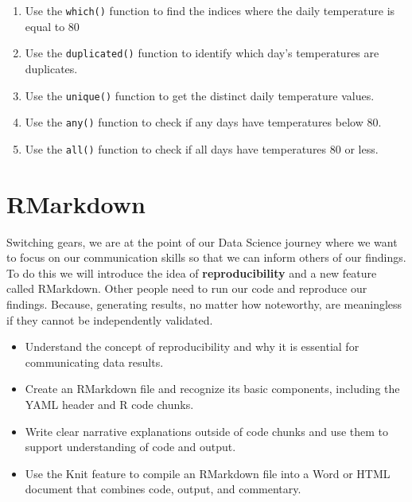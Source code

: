 \documentclass[
  letterpaper,
  DIV=11,
  numbers=noendperiod]{scrreprt}
\providecommand{\tightlist}{%
  \setlength{\itemsep}{0pt}\setlength{\parskip}{0pt}}
\begin{document}
\begin{itemize}
  \begin{enumerate}
  \def\labelenumi{\alph{enumi})}
  \tightlist
  \item
    Use the \texttt{which()} function to find the indices where the
    daily temperature is equal to 80
  \item
    Use the \texttt{duplicated()} function to identify which day's
    temperatures are duplicates.
  \item
    Use the \texttt{unique()} function to get the distinct daily
    temperature values.
  \item
    Use the \texttt{any()} function to check if any days have
    temperatures below 80.
  \item
    Use the \texttt{all()} function to check if all days have
    temperatures 80 or less.
  \end{enumerate}
\end{itemize}


\chapter{RMarkdown}\label{rmarkdown}

Switching gears, we are at the point of our Data Science journey where
we want to focus on our communication skills so that we can inform
others of our findings. To do this we will introduce the idea of
\textbf{reproducibility} and a new feature called RMarkdown. Other
people need to run our code and reproduce our findings. Because,
generating results, no matter how noteworthy, are meaningless if they
cannot be independently validated.

\begin{itemize}
\tightlist
\item
  Understand the concept of reproducibility and why it is essential for
  communicating data results.
\item
  Create an RMarkdown file and recognize its basic components, including
  the YAML header and R code chunks.
\item
  Write clear narrative explanations outside of code chunks and use them
  to support understanding of code and output.
\item
  Use the Knit feature to compile an RMarkdown file into a Word or HTML
  document that combines code, output, and commentary.
\end{itemize}
\end{document}
